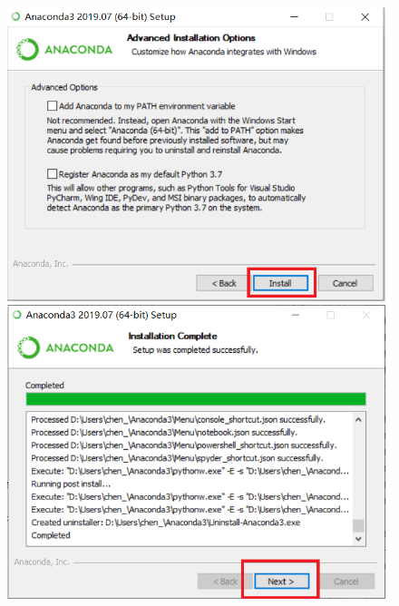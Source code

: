 \begin{figure}[!ht]
  \centering
  \includegraphics[scale=0.5]{figure/chapter1/anaconda10.png}\quad
  \includegraphics[scale=0.5]{figure/chapter1/anaconda12.png}
\end{figure}

